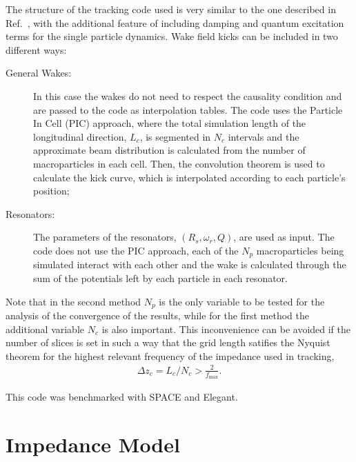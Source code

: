 \begin{apendicesenv}
    The structure of the tracking code used is very similar to the one described in Ref.~, with the additional feature of including damping and quantum excitation terms for the single particle dynamics. Wake field kicks can be included in two different ways:
    \begin{description}
        \item[General Wakes:] In this case the wakes do not need to respect the causality condition and are passed to the code as interpolation tables. The code uses the Particle In Cell (PIC) approach, where the total simulation length of the longitudinal direction, $L_c$, is segmented in $N_c$ intervals and the approximate beam distribution is calculated from the number of macroparticles in each cell. Then, the convolution theorem is used to calculate the kick curve\cite{Bassi2016}, which is interpolated according to each particle's position;
        \item[Resonators:] The parameters of the resonators, $(R_s, \omega_r, Q)$, are used as input. The code does not use the PIC approach, each of the $N_p$ macroparticles being simulated interact with each other and the wake is calculated through the sum of the potentials left by each particle in each resonator.
    \end{description}

    Note that in the second method $N_p$ is the only variable to be tested for the analysis of the convergence of the results, while for the first method the additional variable $N_c$ is also important. This inconvenience can be avoided if the number of slices is set in such a way that the grid length satifies the Nyquist theorem for the highest relevant frequency of the impedance used in tracking,
    \begin{align} \label{eq:nyquist_theorem}
        \Delta z_c = L_c/N_c > \frac{2}{f_\text{max}}.
    \end{align}

    This code was benchmarked with SPACE\cite{Bassi2016} and Elegant\cite{Borland2000}.

\section{Impedance Model}\label{sec:imp_model}


\end{apendicesenv}
